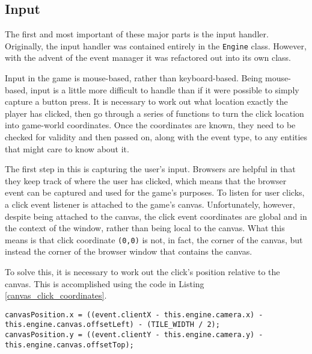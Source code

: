\subsection{Input}
The first and most important of these major parts is the input handler. Originally, the input handler was contained entirely in the \texttt{Engine} class. However, with the advent of the event manager it was refactored out into its own class.

Input in the game is mouse-based, rather than keyboard-based. Being mouse-based, input is a little more difficult to handle than if it were possible to simply capture a button press. It is necessary to work out what location exactly the player has clicked, then go through a series of functions to turn the click location into game-world coordinates. Once the coordinates are known, they need to be checked for validity and then passed on, along with the event type, to any entities that might care to know about it.

The first step in this is capturing the user's input. Browsers are helpful in that they keep track of where the user has clicked, which means that the browser event can be captured and used for the game's purposes. To listen for user clicks, a click event listener is attached to the game's canvas. Unfortunately, however, despite being attached to the canvas, the click event coordinates are global and in the context of the window, rather than being local to the canvas. What this means is that click coordinate \texttt{(0,0)} is not, in fact, the corner of the canvas, but instead the corner of the browser window that contains the canvas.

To solve this, it is necessary to work out the click's position relative to the canvas. This is accomplished using the code in Listing \ref{canvas_click_coordinates}.

\noindent
\begin{minipage}{\linewidth}
\begin{lstlisting}[style=js, caption={Transforming a user's click to be relative to the canvas, rather than the window.}, label=canvas_click_coordinates]
canvasPosition.x = ((event.clientX - this.engine.camera.x) - this.engine.canvas.offsetLeft) - (TILE_WIDTH / 2);
canvasPosition.y = ((event.clientY - this.engine.camera.y) - this.engine.canvas.offsetTop);
\end{lstlisting}
\end{minipage}

